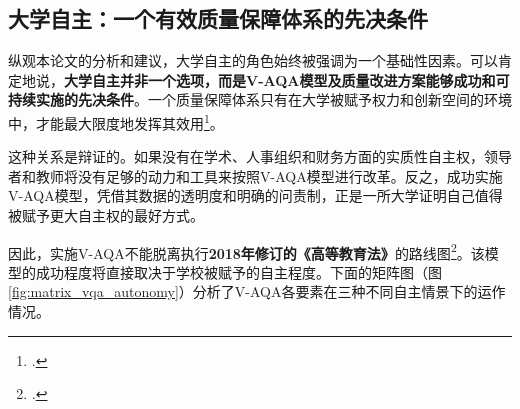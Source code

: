 \subsection{大学自主：一个有效质量保障体系的先决条件}
\label{subsec:banluan_tuchu}

纵观本论文的分析和建议，大学自主的角色始终被强调为一个基础性因素。可以肯定地说，\textbf{大学自主并非一个选项，而是V-AQA模型及质量改进方案能够成功和可持续实施的先决条件}。一个质量保障体系只有在大学被赋予权力和创新空间的环境中，才能最大限度地发挥其效用\footcite{eua_autonomy_qa}。

这种关系是辩证的。如果没有在学术、人事组织和财务方面的实质性自主权，领导者和教师将没有足够的动力和工具来按照V-AQA模型进行改革。反之，成功实施V-AQA模型，凭借其数据的透明度和明确的问责制，正是一所大学证明自己值得被赋予更大自主权的最好方式。

因此，实施V-AQA不能脱离执行\textbf{2018年修订的《高等教育法》}的路线图\footcite{luatvn_gddh_2018}。该模型的成功程度将直接取决于学校被赋予的自主程度。下面的矩阵图（图\ref{fig:matrix_vqa_autonomy}）分析了V-AQA各要素在三种不同自主情景下的运作情况。

